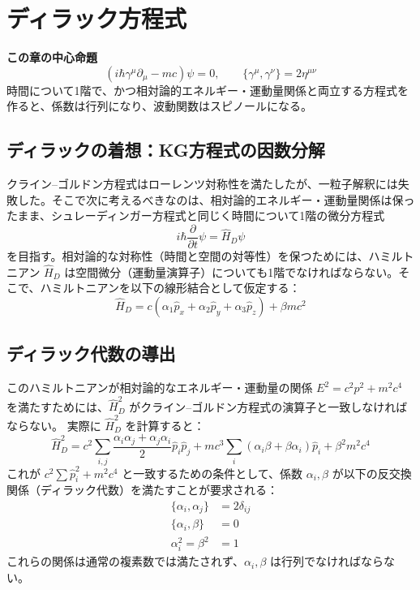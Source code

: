 \section{ディラック方程式}

\noindent\textbf{この章の中心命題}
\[
\boxed{
\left(i\hbar\gamma^\mu\partial_\mu-mc\right)\psi=0,
\qquad
\{\gamma^\mu,\gamma^\nu\}=2\eta^{\mu\nu}
}
\]
時間について1階で、かつ相対論的エネルギー・運動量関係と両立する方程式を作ると、係数は行列になり、波動関数はスピノールになる。

\subsection{ディラックの着想：KG方程式の因数分解}
クライン--ゴルドン方程式はローレンツ対称性を満たしたが、一粒子解釈には失敗した。そこで次に考えるべきなのは、相対論的エネルギー・運動量関係は保ったまま、シュレーディンガー方程式と同じく時間について1階の微分方程式
\begin{equation}
    i\hbar \frac{\partial}{\partial t} \psi = \hat{H}_D \psi
\end{equation}
を目指す。相対論的な対称性（時間と空間の対等性）を保つためには、ハミルトニアン $\hat{H}_D$ は空間微分（運動量演算子）についても1階でなければならない。そこで、ハミルトニアンを以下の線形結合として仮定する：
\begin{equation}
    \hat{H}_D = c (\alpha_1 \hat{p}_x + \alpha_2 \hat{p}_y + \alpha_3 \hat{p}_z) + \beta m c^2
\end{equation}

\subsection{ディラック代数の導出}
このハミルトニアンが相対論的なエネルギー・運動量の関係 $E^2 = c^2 p^2 + m^2 c^4$ を満たすためには、$\hat{H}_D^2$ がクライン--ゴルドン方程式の演算子と一致しなければならない。
実際に $\hat{H}_D^2$ を計算すると：
\begin{equation}
    \hat{H}_D^2 = c^2 \sum_{i,j} \frac{\alpha_i \alpha_j + \alpha_j \alpha_i}{2} \hat{p}_i \hat{p}_j + mc^3 \sum_i (\alpha_i \beta + \beta \alpha_i) \hat{p}_i + \beta^2 m^2 c^4
\end{equation}
これが $c^2 \sum \hat{p}_i^2 + m^2 c^4$ と一致するための条件として、係数 $\alpha_i, \beta$ が以下の反交換関係（ディラック代数）を満たすことが要求される：
\begin{align}
    \{ \alpha_i, \alpha_j \} &= 2\delta_{ij} \\
    \{ \alpha_i, \beta \} &= 0 \\
    \alpha_i^2 = \beta^2 &= 1
\end{align}
これらの関係は通常の複素数では満たされず、$\alpha_i, \beta$ は行列でなければならない。

